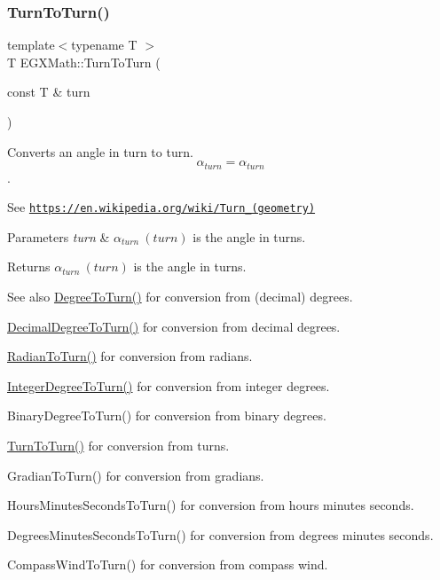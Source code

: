 \mbox{\label{group___e_g_x_math-_angle_conversions-_turn_ga32c8dfa2861fefd0b18e36f8d6d95ed4}} 
\subsubsection{\texorpdfstring{Turn\+To\+Turn()}{TurnToTurn()}}
{\footnotesize\ttfamily template$<$typename T $>$ \\
T E\+G\+X\+Math\+::\+Turn\+To\+Turn (\begin{DoxyParamCaption}\item[{const T \&}]{turn }\end{DoxyParamCaption})}



Converts an angle in turn to turn. \[\alpha_{turn}=\alpha_{turn}\]. 

See \href{https://en.wikipedia.org/wiki/Turn_(geometry)}{\tt https\+://en.\+wikipedia.\+org/wiki/\+Turn\+\_\+(geometry)} 
\begin{DoxyParams}{Parameters}
{\em turn} & $\alpha_{turn}\ (turn)$ is the angle in turns. \\
\hline
\end{DoxyParams}
\begin{DoxyReturn}{Returns}
$\alpha_{turn}\ (turn)$ is the angle in turns. 
\end{DoxyReturn}
\begin{DoxySeeAlso}{See also}
\mbox{\hyperlink{group___e_g_x_math-_angle_conversions-_degree_gafb4ce930493a7d6202ede3ee1630ef5d}{Degree\+To\+Turn()}} for conversion from (decimal) degrees. 

\mbox{\hyperlink{group___e_g_x_math-_angle_conversions-_decimal_degree_ga396a13c10acdef5026c12f3217b142c1}{Decimal\+Degree\+To\+Turn()}} for conversion from decimal degrees. 

\mbox{\hyperlink{group___e_g_x_math-_angle_conversions-_radian_ga8492d6d2f6467c619b65e5fb75a9ae04}{Radian\+To\+Turn()}} for conversion from radians. 

\mbox{\hyperlink{group___e_g_x_math-_angle_conversions-_integer_degree_ga06ddbdada5a3978105c855d4aae735ae}{Integer\+Degree\+To\+Turn()}} for conversion from integer degrees. 

Binary\+Degree\+To\+Turn() for conversion from binary degrees. 

\mbox{\hyperlink{group___e_g_x_math-_angle_conversions-_turn_ga32c8dfa2861fefd0b18e36f8d6d95ed4}{Turn\+To\+Turn()}} for conversion from turns. 

Gradian\+To\+Turn() for conversion from gradians. 

Hours\+Minutes\+Seconds\+To\+Turn() for conversion from hours minutes seconds. 

Degrees\+Minutes\+Seconds\+To\+Turn() for conversion from degrees minutes seconds. 

Compass\+Wind\+To\+Turn() for conversion from compass wind. 
\end{DoxySeeAlso}
